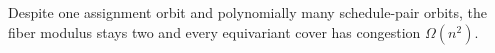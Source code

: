 Despite one assignment orbit and polynomially many schedule-pair orbits, the fiber modulus stays two and every equivariant cover has congestion \(\Omega(n^2)\).